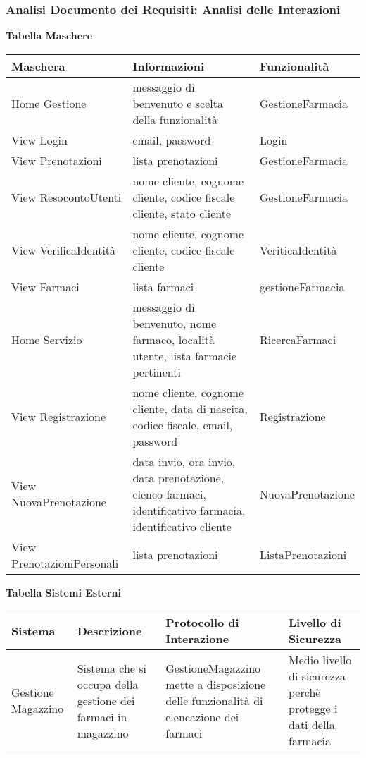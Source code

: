 \newpage

\subsubsection{Analisi Documento dei Requisiti: Analisi delle Interazioni}
\hfill \break

\textbf{Tabella Maschere}
\hfill \break

\begin{tabular} {|P{3.5cm}|P{7cm}|P{5cm}|}
    \hline
    \textbf{Maschera} & \textbf{Informazioni} & \textbf{Funzionalità} \\
    \hline
    Home Gestione & messaggio di benvenuto e scelta della funzionalità & GestioneFarmacia \\
    \hline
    View Login & email, password & Login \\
    \hline
    View Prenotazioni & lista prenotazioni & GestioneFarmacia \\
    \hline
    View ResocontoUtenti & nome cliente, cognome cliente, codice fiscale cliente, stato cliente & GestioneFarmacia \\
    \hline
    View VerificaIdentità & nome cliente, cognome cliente, codice fiscale cliente  & VeriticaIdentità \\
    \hline
    View Farmaci & lista farmaci & gestioneFarmacia \\
    \hline
    Home Servizio & messaggio di benvenuto, nome farmaco, località utente, lista farmacie pertinenti & RicercaFarmaci \\
    \hline
    View Registrazione &  nome cliente, cognome cliente, data di nascita, codice fiscale, email, password  & Registrazione \\
    \hline
    View NuovaPrenotazione & data invio, ora invio, data prenotazione, elenco farmaci, identificativo farmacia, identificativo cliente & NuovaPrenotazione \\
    \hline
    View PrenotazioniPersonali & lista prenotazioni & ListaPrenotazioni \\
    \hline
\end{tabular}
\hfill \break
\hfill \break

\textbf{Tabella Sistemi Esterni}
\hfill \break

\begin{tabular} {|P{3cm}|P{4cm}|P{4cm}|P{4cm}|}
    \hline
    \textbf{Sistema} & \textbf{Descrizione} & \textbf{Protocollo di Interazione} & \textbf{Livello di Sicurezza} \\
    \hline
    Gestione Magazzino  &  Sistema che si occupa della gestione dei farmaci in magazzino  &  GestioneMagazzino mette a disposizione delle funzionalità di elencazione dei farmaci  & Medio livello di sicurezza perchè protegge i dati della farmacia  \\
    \hline
\end{tabular}
\hfill \break

